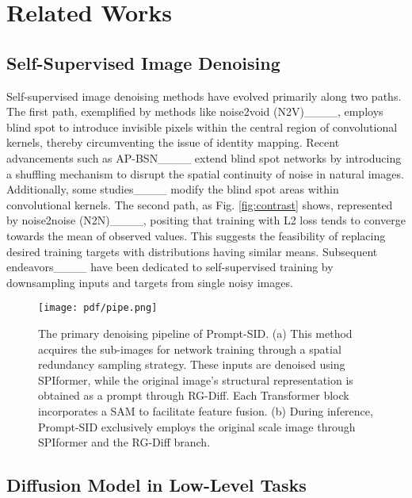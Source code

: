 \section{Related Works}
\subsection{Self-Supervised Image Denoising}
Self-supervised image denoising methods have evolved primarily along two paths. The first path, exemplified by methods like noise2void (N2V)____, employs blind spot to introduce invisible pixels within the central region of convolutional kernels, thereby circumventing the issue of identity mapping. Recent advancements such as AP-BSN____ extend blind spot networks by introducing a shuffling mechanism to disrupt the spatial continuity of noise in natural images. Additionally, some studies____ modify the blind spot areas within convolutional kernels. The second path, as Fig. \ref{fig:contrast} shows, 
represented by noise2noise (N2N)____, positing that training with L2 loss tends to converge towards the mean of observed values. This suggests the feasibility of replacing desired training targets with distributions having similar means. Subsequent endeavors____ have been dedicated to self-supervised training by downsampling inputs and targets from single noisy images. 
\begin{figure*}[h]
  \centering
  \texttt{[image: pdf/pipe.png]}
  \caption{The primary denoising pipeline of Prompt-SID. (a) This method acquires the sub-images for network training through a spatial redundancy sampling strategy. These inputs are denoised using SPIformer, while the original image's structural representation is obtained as a prompt through RG-Diff. Each Transformer block incorporates a SAM to facilitate feature fusion. (b) During inference, Prompt-SID exclusively employs the original scale image through SPIformer and the RG-Diff branch.}
  \label{fig:pipe}
\end{figure*}
\subsection{Diffusion Model in Low-Level Tasks}

